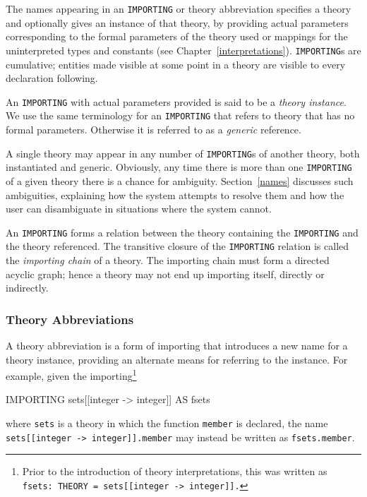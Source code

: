 The names appearing in an \texttt{IMPORTING} or theory abbreviation
specifies a theory and optionally gives an instance of that theory, by
providing actual parameters corresponding to the formal parameters of the
theory used or mappings for the uninterpreted types and constants (see
Chapter~\ref{interpretations}).  \texttt{IMPORTING}s are cumulative;
entities made visible at some point in a theory are visible to every
declaration following.

An \texttt{IMPORTING} with actual parameters provided is said to be a \emph{
theory instance}. We use the same terminology for
an \texttt{IMPORTING} that refers to theory that has no formal parameters.
Otherwise it is referred to as a \emph{generic}
reference.

A single theory may appear in any number of \texttt{IMPORTING}s of another
theory, both instantiated and generic.  Obviously, any time there is
more than one \texttt{IMPORTING} of a given theory there is a chance for
ambiguity.  Section~\ref{names} discusses such ambiguities, explaining
how the system attempts to resolve them and how the user can
disambiguate in situations where the system cannot.

An \texttt{IMPORTING} forms a relation between the theory containing the
\texttt{IMPORTING} and the theory referenced.  The transitive closure of
the \texttt{IMPORTING} relation is called the \emph{importing chain} of a
theory.  The importing chain must form a directed acyclic graph; hence a
theory may not end up importing itself, directly or indirectly.


\subsubsection{Theory Abbreviations}\label{theory-abbreviations}

A theory abbreviation is a form of importing that introduces a new name
for a theory instance, providing an alternate means for referring to the
instance.  For example, given the importing\footnote{Prior to the
introduction of theory interpretations, this was written as
\texttt{fsets:\ THEORY = sets[[integer -> integer]].}}
\begin{pvsex}
  IMPORTING sets[[integer -> integer]] AS fsets
\end{pvsex}
where \texttt{sets} is a theory in which the function \texttt{member} is
declared, the name \texttt{sets[[integer -> integer]].member} may instead
be written as \texttt{fsets.member}.


